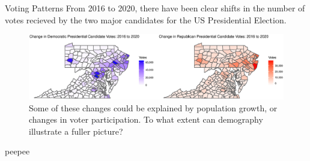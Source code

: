 \documentclass[xcolor=dvipsnames, compress, t]{beamer}
\begin{document}
	\begin{frame}{Voting Patterns}
		From 2016 to 2020, there have been clear shifts in the number of votes recieved by the two major candidates for the US Presidential Election.
		\begin{figure}[1]
			\centering
			\includegraphics[width=1\textwidth]{vote_changes.eps}
			\caption{Some of these changes could be explained by population growth, or changes in voter participation. To what extent can demography illustrate a fuller picture?}
		\end{figure}
	\end{frame}
	\begin{frame}
		\begin{minipage}{.50\linewidth}
			peepee
		\end{minipage}
		\begin{minipage}{.40\linewidth}
			
		\end{minipage}
	\end{frame}
\end{document}
